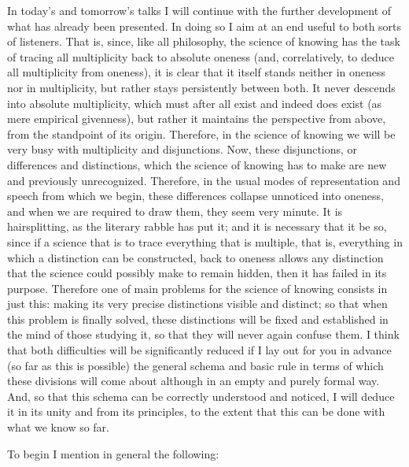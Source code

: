 In today’s and tomorrow’s talks I will continue
with the further development of
what has already been presented.
In doing so I aim at an end
useful to both sorts of listeners.
That is, since, like all philosophy,
the science of knowing has the task of
tracing all multiplicity back to absolute oneness
(and, correlatively, to deduce all multiplicity from oneness),
it is clear that it itself stands neither in oneness nor in multiplicity,
but rather stays persistently between both.
It never descends into absolute multiplicity,
which must after all exist and indeed does exist
(as mere empirical givenness),
but rather it maintains the perspective from above,
from the standpoint of its origin.
Therefore, in the science of knowing we will be
very busy with multiplicity and disjunctions.
Now, these disjunctions, or differences and distinctions,
which the science of knowing has to make
are new and previously unrecognized.
Therefore, in the usual modes of representation and speech
from which we begin,
these differences collapse unnoticed into oneness,
and when we are required to draw them,
they seem very minute.
It is hairsplitting, as the literary rabble has put it;
and it is necessary that it be so,
since if a science that is to trace
everything that is multiple, that is,
everything in which a distinction can be constructed,
back to oneness allows any distinction
that the science could possibly make to remain hidden,
then it has failed in its purpose.
Therefore one of main problems for
the science of knowing consists in just this:
making its very precise distinctions visible and distinct;
so that when this problem is finally solved,
these distinctions will be fixed and established
in the mind of those studying it,
so that they will never again confuse them.
I think that both difficulties
will be significantly reduced
if I lay out for you in advance (so far as this is possible)
the general schema and basic rule
in terms of which these divisions will come about
although in an empty and purely formal way.
And, so that this schema can be
correctly understood and noticed,
I will deduce it in its unity
and from its principles,
to the extent that this can be done
with what we know so far.

To begin I mention in general the following:

